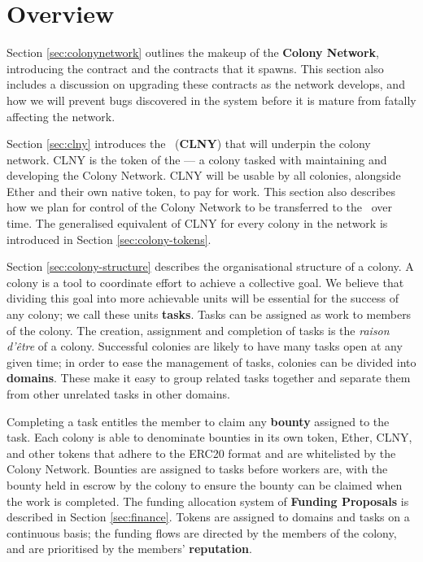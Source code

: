 \section{Overview}

Section \ref{sec:colonynetwork} outlines the makeup of the \textbf{Colony Network}, introducing the  contract and the  contracts that it spawns. This section also includes a discussion on upgrading these contracts as the network develops, and how we will prevent bugs discovered in the system before it is mature from fatally affecting the network.

Section \ref{sec:clny} introduces the \rcts\ (\textbf{CLNY}) that will underpin the colony network. CLNY is the token of the \textbf{\rc} --- a colony tasked with maintaining and developing the Colony Network. CLNY will be usable by all colonies, alongside Ether and their own native token, to pay for work. This section also describes how we plan for control of the Colony Network to be transferred to the \rc\ over time. The generalised equivalent of CLNY for every colony in the network is introduced in Section \ref{sec:colony-tokens}.

Section \ref{sec:colony-structure} describes the organisational structure of a colony. A colony is a tool to coordinate effort to achieve a collective goal. We believe that dividing this goal into more achievable units will be essential for the success of any colony; we call these units \textbf{tasks}. Tasks can be assigned as work to members of the colony. The creation, assignment and completion of tasks is the \emph{raison d'{\^e}tre} of a colony. Successful colonies are likely to have many tasks open at any given time; in order to ease the management of tasks, colonies can be divided into \textbf{domains}. These make it easy to group related tasks together and separate them from other unrelated tasks in other domains.

Completing a task entitles the member to claim any \textbf{bounty} assigned to the task. Each colony is able to denominate bounties in its own token, Ether, CLNY, and other tokens that adhere to the ERC20 format \cite{erc20} and are whitelisted by the Colony Network. Bounties are assigned to tasks before workers are, with the bounty held in escrow by the colony to ensure the bounty can be claimed when the work is completed. The funding allocation system of \textbf{Funding Proposals} is described in Section \ref{sec:finance}. Tokens are assigned to domains and tasks on a continuous basis; the funding flows are directed by the members of the colony, and are prioritised by the members' \textbf{reputation}.

